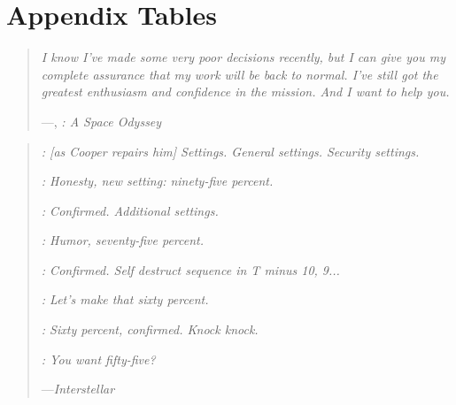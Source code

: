 \chapter{Appendix Tables}

\begin{quote}
  \emph{I know I've made some very poor decisions recently, but I can give you my complete assurance that my work will be back to normal. I've still got the greatest enthusiasm and confidence in the mission. And I want to help you.}
  \begin{flushright}
    —, \emph{: A Space Odyssey}
  \end{flushright}
\end{quote}


\vspace{1em}

\begin{quote}
  \emph{: \emph{[as Cooper repairs him]} Settings. General settings. Security settings.}
  
  \emph{: Honesty, new setting: ninety-five percent.}
  
  \emph{: Confirmed. Additional settings.}
  
  \emph{: Humor, seventy-five percent.}
  
  \emph{: Confirmed. Self destruct sequence in T minus 10, 9...}
  
  \emph{: Let's make that sixty percent.}
  
  \emph{: Sixty percent, confirmed. Knock knock.}
  
  \emph{: You want fifty-five?}
  
  \begin{flushright}
    —\emph{Interstellar}
  \end{flushright}
\end{quote}

\fancyhfoffset[E,O]{0pt}

